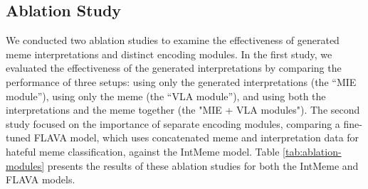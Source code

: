 \subsection{Ablation Study}


We conducted two ablation studies to examine the effectiveness of generated meme interpretations and distinct encoding modules. In the first study, we evaluated the effectiveness of the generated interpretations by comparing the performance of three setups: using only the generated interpretations (the ``MIE module''), using only the meme (the ``VLA module''), and using both the interpretations and the meme together (the "MIE + VLA modules"). The second study focused on the importance of separate encoding modules, comparing a fine-tuned FLAVA model, which uses concatenated meme and interpretation data for hateful meme classification, against the \textsf{IntMeme} model. Table \ref{tab:ablation-modules} presents the results of these ablation studies for both the \textsf{IntMeme} and FLAVA models.

